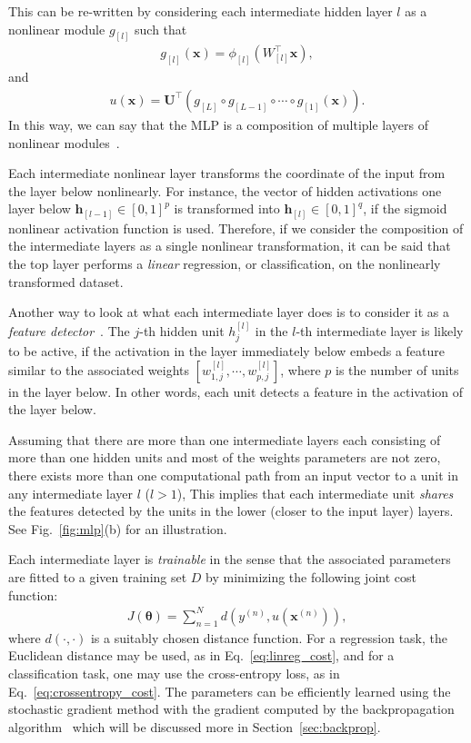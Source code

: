 \documentclass{now}
\newcommand{\qlay}[1]{\left[#1\right]}
\newcommand{\vect}[1]{\mathbf{#1}}
\newcommand{\vects}[1]{\boldsymbol{#1}}
\newcommand{\matr}[1]{\mathbf{#1}}
\newcommand{\vh}[0]{\vect{h}}
\newcommand{\vx}[0]{\vect{x}}
\newcommand{\mU}[0]{\matr{U}}
\newcommand{\TT}[0]{{\vects{\theta}}}
\begin{document}
This can be re-written by considering each intermediate hidden layer $l$ as a
nonlinear module $g_{\qlay{l}}$ such that
\begin{align*}
    g_{\qlay{l}}(\vx) = \phi_{\qlay{l}}(W_{\qlay{l}}^\top \vx),
\end{align*}
and
\begin{align*}
    u(\vx) = \mU^\top 
    \left(g_{\qlay{L}} \circ g_{\qlay{L-1}} \circ \cdots
    \circ g_{\qlay{1}} (\vx) \right).
\end{align*}
In this way, we can say that the MLP is a composition of multiple layers of
nonlinear modules~\citep{Bengio2007a}.

Each intermediate nonlinear layer transforms the coordinate of the input from
the layer below nonlinearly. For instance, the vector of hidden activations one
layer below $\vh_{\qlay{l-1}} \in \left[ 0, 1\right]^p$ is transformed into
$\vh_{\qlay{l}} \in \left[0, 1\right]^q$, if the sigmoid nonlinear activation
function is used. Therefore, if we consider the composition of the intermediate
layers as a single nonlinear transformation, it can be said that the top layer
performs a \textit{linear} regression, or classification, on the nonlinearly
transformed dataset. 

Another way to look at what each intermediate layer does is to consider it as a
\textit{feature detector}~\citep[see, e.g.,][]{Haykin2009}. The $j$-th hidden
unit $h_j^{\qlay{l}}$ in the $l$-th intermediate layer is likely to be active,
if the activation in the layer immediately below embeds a feature similar to the
associated weights $\left[ w_{1,j}^{\qlay{l}}, \cdots, w_{p,j}^{\qlay{l}}
\right]$, where $p$ is the number of units in the layer below. In other words,
each unit detects a feature in the activation of the layer below.

Assuming that there are more than one intermediate layers each consisting of
more than one hidden units and most of the weights parameters are not zero,
there exists more than one computational path from an input vector to a unit in
any intermediate layer $l$ ($l > 1$),  This implies that each intermediate unit
\textit{shares} the features detected by the units in the lower (closer to the
input layer) layers.  See Fig.~\ref{fig:mlp}(b) for an illustration.

Each intermediate layer is \textit{trainable} in the sense that the associated
parameters are fitted to a given training set $D$ by minimizing the following
joint cost function:
\begin{align}
    \label{eq:mlp_cost}
    J(\TT) = \sum_{n=1}^N d\left(y^{(n)}, u(\vx^{(n)})\right),
\end{align}
where $d(\cdot, \cdot)$ is a suitably chosen distance function. For a regression
task, the Euclidean distance may be used, as in Eq.~\eqref{eq:linreg_cost}, and
for a classification task, one may use the cross-entropy loss, as in
Eq.~\eqref{eq:crossentropy_cost}. The parameters can be efficiently learned
using the stochastic gradient method with the gradient computed by the
backpropagation algorithm~\citep{Werbos1974,Rumelhart1986} which will be
discussed more in Section~\ref{sec:backprop}.
\end{document}
